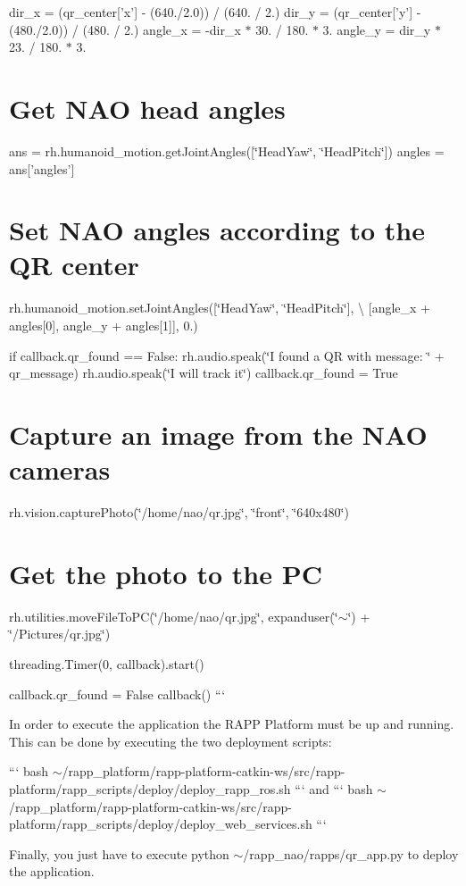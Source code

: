 dir\-\_\-x = (qr\-\_\-center\mbox{[}'x'\mbox{]} -\/ (640./2.0)) / (640. / 2.) dir\-\_\-y = (qr\-\_\-center\mbox{[}'y'\mbox{]} -\/ (480./2.0)) / (480. / 2.) angle\-\_\-x = -\/dir\-\_\-x $\ast$ 30. / 180. $\ast$ 3. angle\-\_\-y = dir\-\_\-y $\ast$ 23. / 180. $\ast$ 3.

\section*{Get N\-A\-O head angles}

ans = rh.\-humanoid\-\_\-motion.\-get\-Joint\-Angles(\mbox{[}\char`\"{}\-Head\-Yaw\char`\"{}, \char`\"{}\-Head\-Pitch\char`\"{}\mbox{]}) angles = ans\mbox{[}'angles'\mbox{]}

\section*{Set N\-A\-O angles according to the Q\-R center}

rh.\-humanoid\-\_\-motion.\-set\-Joint\-Angles(\mbox{[}\char`\"{}\-Head\-Yaw\char`\"{}, \char`\"{}\-Head\-Pitch\char`\"{}\mbox{]}, \textbackslash{} \mbox{[}angle\-\_\-x + angles\mbox{[}0\mbox{]}, angle\-\_\-y + angles\mbox{[}1\mbox{]}\mbox{]}, 0.)

if callback.\-qr\-\_\-found == False\-: rh.\-audio.\-speak(\char`\"{}\-I found a Q\-R with message\-: \char`\"{} + qr\-\_\-message) rh.\-audio.\-speak(\char`\"{}\-I will track it\char`\"{}) callback.\-qr\-\_\-found = True

\section*{Capture an image from the N\-A\-O cameras}

rh.\-vision.\-capture\-Photo(\char`\"{}/home/nao/qr.\-jpg\char`\"{}, \char`\"{}front\char`\"{}, \char`\"{}640x480\char`\"{}) \section*{Get the photo to the P\-C}

rh.\-utilities.\-move\-File\-To\-P\-C(\char`\"{}/home/nao/qr.\-jpg\char`\"{}, expanduser(\char`\"{}$\sim$\char`\"{}) + \char`\"{}/\-Pictures/qr.\-jpg\char`\"{})

threading.\-Timer(0, callback).start()

callback.\-qr\-\_\-found = False callback() ```

In order to execute the application the R\-A\-P\-P Platform must be up and running. This can be done by executing the two deployment scripts\-:

``` bash $\sim$/rapp\-\_\-platform/rapp-\/platform-\/catkin-\/ws/src/rapp-\/platform/rapp\-\_\-scripts/deploy/deploy\-\_\-rapp\-\_\-ros.sh ``` and ``` bash $\sim$/rapp\-\_\-platform/rapp-\/platform-\/catkin-\/ws/src/rapp-\/platform/rapp\-\_\-scripts/deploy/deploy\-\_\-web\-\_\-services.sh ```

Finally, you just have to execute {\ttfamily python $\sim$/rapp\-\_\-nao/rapps/qr\-\_\-app.py} to deploy the application. 